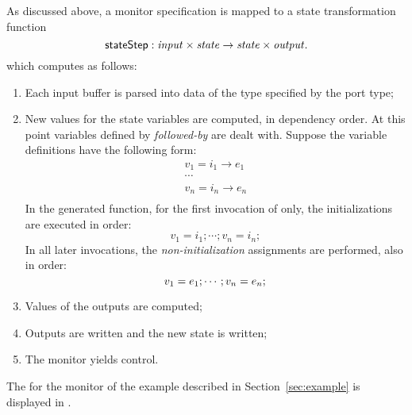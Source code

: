 As discussed above, a monitor specification is
mapped to a state transformation function
%
\[
\mathsf{stateStep} : \mathit{input} \times \mathit{state} \to \mathit{state} \times \mathit{output}.
\]
which computes as follows:
\begin{enumerate}

\item Each input buffer is parsed into data of the type specified by the port
  type;

\item New values for the state variables are computed, in dependency
  order. At this point variables defined by \emph{followed-by} are
  dealt with. Suppose the variable definitions have the following
  form:
\[
\begin{array}{l}
  v_1 = i_1 \longrightarrow e_1 \\
  \cdots \\
  v_n = i_n \longrightarrow e_n \\
\end{array}
\]
In the generated function, for the first invocation of  only,
the initializations are executed in order:
\[
  v_1 = i_1; \cdots ;  v_n = i_n;
\]
In all later invocations, the \emph{non-initialization} assignments are performed, also in order:
\[
  v_1 = e_1; \cdots ; v_n = e_n; \\
\]

\item Values of the outputs are computed;

\item Outputs are written and the new state is written;

\item The monitor yields control.
\end{enumerate}

The  for the monitor of the example described in
Section~\ref{sec:example} is displayed in .

